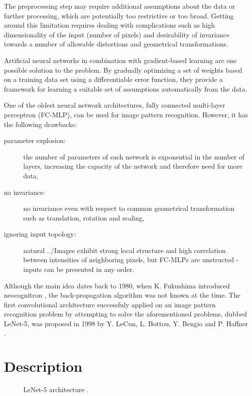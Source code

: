 \documentclass[11pt,czech,american,dvipsnames]{book}
\begin{document}
The preprocessing step may require additional assumptions about the data or further processing, which are potentially too restrictive or too broad. Getting around this limitation requires dealing with complications such as high dimensionality of the input (number of pixels) and desirability of invariance towards a number of allowable distortions and geometrical transformations.

Artificial neural networks in combination with gradient-based learning are one possible solution to the problem. By gradually optimizing a set of weights based on a training data set using a differentiable error function, they provide a framework for learning a suitable set of assumptions automatically from the data.

One of the oldest neural network architectures, fully connected multi-layer perceptron (FC-MLP), can be used for image pattern recognition. However, it has the following drawbacks:
\begin{description}
  \item[parameter explosion:] the number of parameters of such network is exponential in the number of layers, increasing the capacity of the network and therefore need for more data,
  \item[no invariance:] no invariance even with respect to common geometrical transformation such as translation, rotation and scaling,
  \item[ignoring input topology:] natural ../Images exhibit strong local structure and high correlation between intensities of neighboring pixels, but FC-MLPs are unstructed - inputs can be presented in any order.
\end{description}

Although the main idea dates back to 1980, when K. Fukushima introduced neocognitron \cite{fukushima1982}, the back-propagation algorithm was not known at the time. The first convolutional architecture successfuly applied on an image pattern recognition problem by attempting to solve the aforementioned problems, dubbed LeNet-5, was proposed in 1998 by Y. LeCun, L. Bottou, Y. Bengio and P. Haffner \cite{LeCun1998}.

\section{Description}

\begin{figure} 
\centering
\noindent{}
  \caption{LeNet-5 architecture \cite{lecun1999}.}
\label{fig:lenet-5}
\end{figure}
\end{document}
